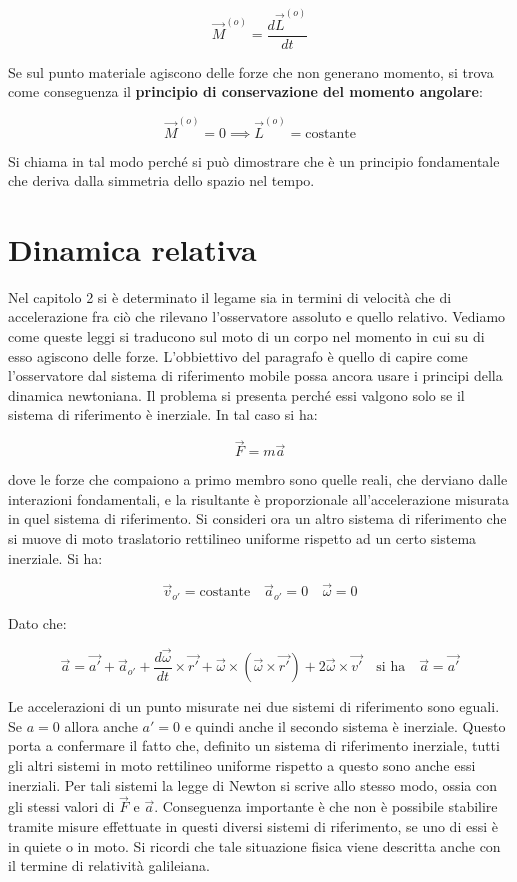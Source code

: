 \[
	\boxed{\vec{M}^{(o)}= \frac{d\vec{L}^{(o)}}{dt}}
\]

Se sul punto materiale agiscono delle forze che non generano momento, si trova come conseguenza il \textbf{principio di conservazione del momento angolare}:

\[
	\boxed{\vec{M}^{(o)}=0 \implies \vec{L}^{(o)}= \text{costante}}
\]

Si chiama in tal modo perché si può dimostrare che è un principio fondamentale che deriva dalla simmetria dello spazio nel tempo.

\section{Dinamica relativa}

Nel capitolo 2 si è determinato il legame sia in termini di velocità che di accelerazione fra ciò che rilevano l'osservatore assoluto e quello relativo. Vediamo come queste leggi si traducono sul moto di un corpo nel momento in cui su di esso agiscono delle forze. L'obbiettivo del paragrafo è quello di capire come l'osservatore dal sistema di riferimento mobile possa ancora usare i principi della dinamica newtoniana.
Il problema si presenta perché essi valgono solo se il sistema di riferimento è inerziale. In tal caso si ha:

\[
	\vec{F}=m\vec{a}
\]

dove le forze che compaiono a primo membro sono quelle reali, che derviano dalle interazioni fondamentali, e la risultante è proporzionale all'accelerazione misurata in quel sistema di riferimento. Si consideri ora un altro sistema di riferimento che si muove di moto traslatorio rettilineo uniforme rispetto ad un certo sistema inerziale. Si ha:

\[
	\vec{v}_{o'}=\text{costante} \quad \vec{a}_{o'}=0 \quad \vec{\omega}=0
\]

Dato che:

\[
	\vec{a}=\vec{a'}+\vec{a}_{o'}+\frac{d\vec{\omega}}{dt} \times \vec{r'}+\vec{\omega}\times (\vec{\omega} \times \vec{r'})+2\vec{\omega} \times \vec{v'} \quad \text{si ha} \quad \vec{a}=\vec{a'}
\]

Le accelerazioni di un punto misurate nei due sistemi di riferimento sono eguali. Se $a=0$ allora anche $a'=0$ e quindi anche il secondo sistema è inerziale. Questo porta a confermare il fatto che, definito un sistema di riferimento inerziale, tutti gli altri sistemi in moto rettilineo uniforme rispetto a questo sono anche essi inerziali. Per tali sistemi la legge di Newton si scrive allo stesso modo, ossia con gli stessi valori di $\vec{F}$ e $\vec{a}$. Conseguenza importante è che non è possibile stabilire tramite misure effettuate in questi diversi sistemi di riferimento, se uno di essi è in quiete o in moto. Si ricordi che tale situazione fisica viene descritta anche con il termine di relatività galileiana.

